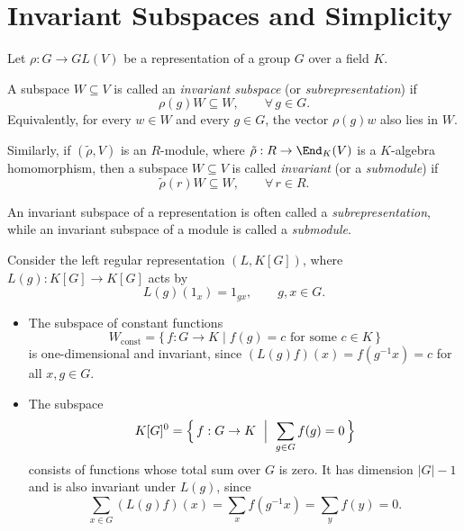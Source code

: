 \section{Invariant Subspaces and Simplicity}\label{sec:invariant-simplicity}

\begin{definition}\label{def:invariant-subspace}
Let $\rho:G\to GL(V)$ be a representation of a group $G$ over a field $K$.

A subspace $W\subseteq V$ is called an \emph{invariant subspace} (or \emph{subrepresentation}) if
\[
\rho(g)W \subseteq W, \qquad \forall\, g\in G.
\]
Equivalently, for every $w\in W$ and every $g\in G$, the vector $\rho(g)w$ also lies in $W$.

\smallskip
Similarly, if $(\tilde{\rho},V)$ is an $R$-module, where $\tilde{\rho}:R\to\End_K(V)$ is a $K$-algebra homomorphism,
then a subspace $W\subseteq V$ is called \emph{invariant} (or a \emph{submodule}) if
\[
\tilde{\rho}(r)W\subseteq W, \qquad \forall\, r\in R.
\]
\end{definition}

\begin{remark}
An invariant subspace of a representation is often called a \emph{subrepresentation}, while an invariant subspace of a module is called a \emph{submodule}.
\end{remark}

\begin{example}\label{ex:regular-invariants}
Consider the left regular representation $(L,K[G])$, where $L(g):K[G]\to K[G]$ acts by
\[
L(g)(1_x)=1_{gx}, \qquad g,x\in G.
\]

\begin{itemize}
    \item The subspace of constant functions
    \[
    W_{\mathrm{const}}=\{\,f:G\to K \mid f(g)=c \text{ for some } c\in K\,\}
    \]
    is one-dimensional and invariant, since $(L(g)f)(x)=f(g^{-1}x)=c$ for all $x,g\in G$.

    \item The subspace
    \[
    K[G]^0=\Bigl\{\,f:G\to K \ \Bigm|\  \sum_{g\in G}f(g)=0\,\Bigr\}
    \]
    consists of functions whose total sum over $G$ is zero.
    It has dimension $|G|-1$ and is also invariant under $L(g)$, since
    \[
    \sum_{x\in G}(L(g)f)(x)
      = \sum_{x} f(g^{-1}x)
      = \sum_{y} f(y)
      = 0.
    \]
\end{itemize}
\end{example}

